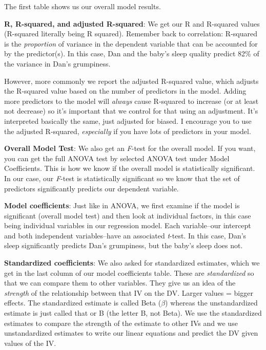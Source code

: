\documentclass[
]{book}
\begin{document}
The first table shows us our overall model results.

\textbf{R, R-squared, and adjusted R-squared}: We get our R and R-squared values (R-squared literally being R squared). Remember back to correlation: R-squared is the \emph{proportion} of variance in the dependent variable that can be accounted for by the predictor(s). In this case, Dan and the baby's sleep quality predict 82\% of the variance in Dan's grumpiness.

However, more commonly we report the adjusted R-squared value, which adjusts the R-squared value based on the number of predictors in the model. Adding more predictors to the model will \emph{always} cause R-squared to increase (or at least not decrease) so it's important that we control for that using an adjustment. It's interpreted basically the same, just adjusted for biased. I encourage you to use the adjusted R-squared, \emph{especially} if you have lots of predictors in your model.

\textbf{Overall Model Test}: We also get an \emph{F}-test for the overall model. If you want, you can get the full ANOVA test by selected ANOVA test under Model Coefficients. This is how we know if the overall model is statistically significant. In our case, our \emph{F}-test is statistically significant so we know that the set of predictors significantly predicts our dependent variable.

\textbf{Model coefficients}: Just like in ANOVA, we first examine if the model is significant (overall model test) and then look at individual factors, in this case being individual variables in our regression model. Each variable--our intercept and both independent variables--have an associated \emph{t}-test. In this case, Dan's sleep significantly predicts Dan's grumpiness, but the baby's sleep does not.

\textbf{Standardized coefficients}: We also asked for standardized estimates, which we get in the last column of our model coefficients table. These are \emph{standardized} so that we can compare them to other variables. They give us an idea of the \emph{strength} of the relationship between that IV on the DV. Larger values = bigger effects. The standardized estimate is called Beta (\(\beta\)) whereas the unstandardized estimate is just called that or B (the letter B, not Beta). We use the standardized estimates to compare the strength of the estimate to other IVs and we use unstandardized estimates to write our linear equations and predict the DV given values of the IV.
\end{document}
